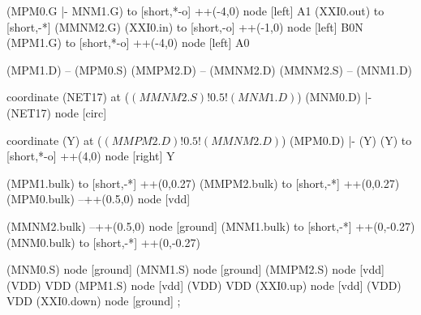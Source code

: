 \begin{circuitikz}[american]
	(MPM0.G |- MNM1.G) to [short,*-o] ++(-4,0) node [left] {A1}
	(XXI0.out) to [short,-*] (MMNM2.G)
	(XXI0.in) to [short,-o] ++(-1,0) node [left] {B0N}
	(MPM1.G) to [short,*-o] ++(-4,0) node [left] {A0}
	
	(MPM1.D) -- (MPM0.S)
	(MMPM2.D) -- (MMNM2.D)
	(MMNM2.S) -- (MNM1.D)
	
	coordinate (NET17) at ($(MMNM2.S)!0.5!(MNM1.D)$)
	(MNM0.D) |- (NET17) node [circ] {}
	
	coordinate (Y) at ($(MMPM2.D)!0.5!(MMNM2.D)$)
	(MPM0.D) |- (Y)
	(Y) to [short,*-o] ++(4,0) node [right] {Y}
	
	(MPM1.bulk) to [short,-*] ++(0,0.27)
	(MMPM2.bulk) to [short,-*] ++(0,0.27)	
	(MPM0.bulk) --++(0.5,0) node [vdd]{}
	
	(MMNM2.bulk) --++(0.5,0) node [ground]{}
	(MNM1.bulk) to [short,-*] ++(0,-0.27) 
	(MNM0.bulk) to [short,-*] ++(0,-0.27) 


	(MNM0.S) node [ground] {}
	(MNM1.S) node [ground] {}
	(MMPM2.S) node [vdd] (VDD) {VDD}
	(MPM1.S) node [vdd] (VDD) {VDD}
	(XXI0.up) node [vdd] (VDD) {VDD}
	(XXI0.down) node [ground] {}
;

\end{circuitikz}
